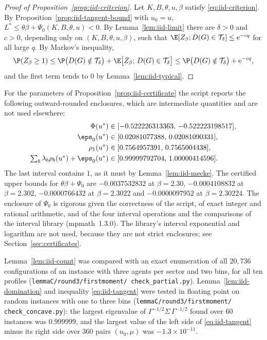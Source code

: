 \begin{proof}[Proof of Proposition~\ref{prop:iid-criterion}]
Let $K,B,\theta,u,\beta$ satisfy \eqref{eq:iid-criterion}. By
Proposition~\ref{prop:iid-tangent-bound} with $u_0=u$,
$L^\ast\le\theta\beta+\Psi_0(K,B,\theta,u)<0$. By Lemma~\ref{lem:iid-limit} there are
$\delta>0$ and $c>0$, depending only on $(K,B,\theta,u,\beta)$, such that
$\E[Z_\beta;D(G)\in\mathcal{T}_\delta]\le\mathrm{e}^{-cq}$ for all large $q$. By Markov's
inequality,
\[
\P(Z_\beta\ge1)\le\P\bigl(D(G)\notin\mathcal{T}_\delta\bigr)
+\E\bigl[Z_\beta;\,D(G)\in\mathcal{T}_\delta\bigr]
\le\P\bigl(D(G)\notin\mathcal{T}_\delta\bigr)+\mathrm{e}^{-cq},
\]
and the first term tends to $0$ by Lemma~\ref{lem:iid-typical}.
\end{proof}

\begin{remark}\label{rem:iid-certificate}
For the parameters of Proposition~\ref{prop:iid-certificate} the script reports the
following outward-rounded enclosures, which are intermediate quantities and are not used
elsewhere:
\begin{align*}
\Phi(u^\ast)&\in[-0.522226313363,\,-0.522223198517],\\
\eps_0(u^\ast)&\in[0.02081077388,\,0.02081090331],\\
\rho_1(u^\ast)&\in[0.7564957391,\,0.7565004438],\\
\textstyle\sum_b\lambda_b\rho_b(u^\ast)+\eps_0(u^\ast)&\in[0.99999792704,\,1.00000414596].
\end{align*}
The last interval contains $1$, as it must by Lemma~\ref{lem:iid-mecke}. The certified
upper bounds for $\theta\beta+\Psi_0$ are $-0.0037532832$ at $\beta=2.30$,
$-0.0004108832$ at $\beta=2.302$, $-0.0000766432$ at $\beta=2.3022$ and $-0.0000097952$
at $\beta=2.30224$. The enclosure of $\Psi_0$ is rigorous given the correctness of the
script, of exact integer and rational arithmetic, and of the four interval operations and
the comparisons of the interval library (mpmath~1.3.0). The library's interval exponential
and logarithm are not used, because they are not strict enclosures; see
Section~\ref{sec:certificates}.
\end{remark}

\begin{remark}\label{rem:iid-checks}
Lemma~\ref{lem:iid-count} was compared with an exact enumeration of all $20{,}736$
configurations of an instance with three agents per sector and two bins, for all ten
profiles (\texttt{lemmaC/\allowbreak round3/\allowbreak firstmoment/\allowbreak
check\_partial.py}).
Lemma~\ref{lem:iid-domination} and inequality \eqref{eq:iid-tangent} were tested in
floating point on random instances with one to three bins
(\texttt{lemmaC/\allowbreak round3/\allowbreak firstmoment/\allowbreak
check\_concave.py}): the largest eigenvalue of
$\Gamma^{-1/2}\Sigma\,\Gamma^{-1/2}$ found over $60$ instances was $0.999999$, and the
largest value of the left side of \eqref{eq:iid-tangent} minus its right side over $360$
pairs $(u_0,\mu)$ was $-1.3\times10^{-11}$.
\end{remark}
